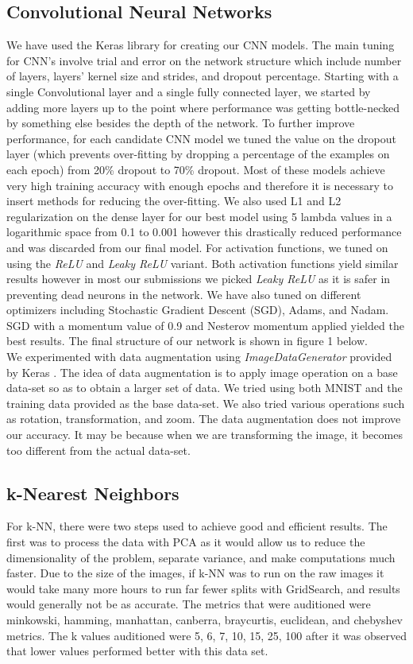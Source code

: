 \documentclass[twoside,twocolumn]{article}
\begin{document}
\subsection{Convolutional Neural Networks}
We have used the Keras \cite{KERAS} library for creating our CNN models. The main tuning for CNN's involve trial and error on the network structure which include number of layers, layers' kernel size and strides, and dropout percentage. Starting with a single Convolutional layer and a single fully connected layer, we started by adding more layers up to the point where performance was getting bottle-necked by something else besides the depth of the network. To further improve performance, for each candidate CNN model we tuned the value on the dropout layer (which prevents over-fitting by dropping a percentage of the examples on each epoch) from 20\% dropout to 70\% dropout. Most of these models achieve very high training accuracy with enough epochs and therefore it is necessary to insert methods for reducing the over-fitting. We also used L1 and L2 regularization on the dense layer for our best model using 5 lambda values in a logarithmic space from 0.1 to 0.001 however this drastically reduced performance and was discarded from our final model. For activation functions, we tuned on using the \textit{ReLU} and \textit{Leaky ReLU} variant. Both activation functions yield similar results however in most our submissions we picked \textit{Leaky ReLU} as it is safer in preventing dead neurons in the network. We have also tuned on different optimizers including Stochastic Gradient Descent (SGD), Adams, and Nadam. SGD with a momentum value of 0.9 and Nesterov momentum applied yielded the best results. The final structure of our network is shown in figure 1 below. \\

We experimented with data augmentation using \textit{ImageDataGenerator} provided by Keras \cite{KERAS}. The idea of data augmentation is to apply image operation on a base data-set so as to obtain a larger set of data. We tried using both MNIST and the training data provided as the base data-set. We also tried various operations such as rotation, transformation, and zoom. The data augmentation does not improve our accuracy. It may be because when we are transforming the image, it becomes too different from the actual data-set.
\subsection{k-Nearest Neighbors}
For k-NN, there were two steps used to achieve good and efficient results. The first was to process the data with PCA as it would allow us to reduce the dimensionality of the problem, separate variance, and make computations much faster. Due to the size of the images, if k-NN was to run on the raw images it would take many more hours to run far fewer splits with GridSearch, and results would generally not be as accurate. The metrics that were auditioned were minkowski, hamming, manhattan, canberra, braycurtis, euclidean, and chebyshev metrics. The k values auditioned were 5, 6, 7, 10, 15, 25, 100 after it was observed that lower values performed better with this data set.
\end{document}
